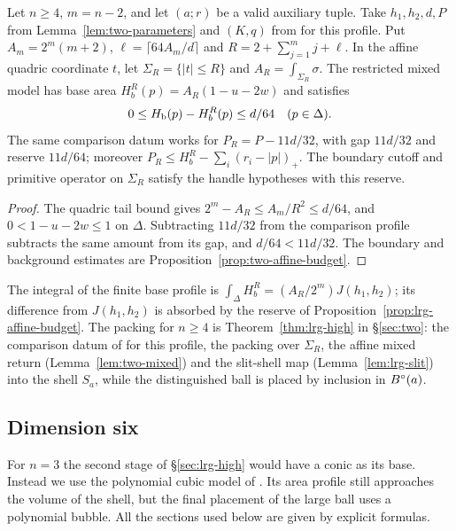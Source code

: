 \begin{proposition}\label{prop:lrg-affine-budget}
Let $n\ge4$, $m=n-2$, and let $(a;r)$ be a valid auxiliary tuple. Take $h_1,h_2,d,P$ from
Lemma~\ref{lem:two-parameters} and $(K,q)$ from  for this profile.
Put $A_m=2^m(m+2)$, $\ell=\lceil64A_m/d\rceil$ and
$R=2+\sum_{j=1}^m j+\ell$. In the affine quadric coordinate $t$, let $\Sigma_R=\{|t|\le R\}$ and
$A_R=\int_{\Sigma_R}\sigma$. The restricted mixed model has base area
$H_b^R(p)=A_R(1-u-2w)$ and satisfies
\[
 0\le H_{\mathrm b}(p)-H_b^R(p)\le d/64\quad(p\in\Delta).
\]
The same comparison datum works for $P_R=P-11d/32$, with gap $11d/32$ and reserve $11d/64$;
moreover $P_R\le H_b^R-\sum_i(r_i-|p|)_+$. The boundary cutoff and primitive operator on $\Sigma_R$
satisfy the handle hypotheses with this reserve.
\end{proposition}

\begin{proof}
The quadric tail bound gives $2^m-A_R\le A_m/R^2\le d/64$, and $0<1-u-2w\le1$ on $\Delta$.
Subtracting $11d/32$ from the comparison profile subtracts the same amount from its gap, and
$d/64<11d/32$. The boundary and background estimates are Proposition~\ref{prop:two-affine-budget}.
\end{proof}

The integral of the finite base profile is $\int_\Delta H_b^R=(A_R/2^m)J(h_1,h_2)$; its difference from
$J(h_1,h_2)$ is absorbed by the reserve of Proposition~\ref{prop:lrg-affine-budget}.
The packing for $n\ge4$ is Theorem~\ref{thm:lrg-high} in \S\ref{sec:two}: the comparison datum of
 for this profile, the packing over $\Sigma_R$, the affine mixed return
(Lemma~\ref{lem:two-mixed}) and the slit-shell map (Lemma~\ref{lem:lrg-slit}) into the shell $S_a$, while the
distinguished ball is placed by inclusion in $B^{\circ}(a)$.

\subsection{Dimension six}\label{sec:lrg-six}

For $n=3$ the second stage of \S\ref{sec:lrg-high} would have a conic as its base.
Instead we use the polynomial cubic model of \cite{OpenAI2026}.
Its area profile still approaches the volume of the shell, but the final placement of the
large ball uses a polynomial bubble. All the sections used below are given by explicit formulas.

